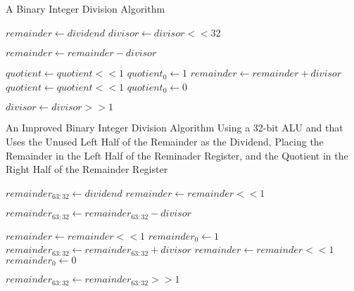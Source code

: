 \documentclass[11pt]{article}
\begin{document}
\begin{algorithm}[hbt!]
\caption{A Binary Integer Division Algorithm}\label{alg:div1}
\begin{algorithmic}

\State $remainder \gets dividend$
\State $divisor \gets divisor << 32$

    \State $remainder \gets remainder - divisor$
    
        \State $quotient \gets quotient << 1$
        \State $quotient_{0} \gets 1$
    \Else
        \State $remainder \gets remainder + divisor$
        \State $quotient \gets quotient << 1$
        \State $quotient_{0} \gets 0$    
    \EndIf
    
    \State $divisor \gets divisor >> 1$
\EndFor

\end{algorithmic}
\end{algorithm}

\pagebreak

\begin{algorithm}[hbt!]
\caption{An Improved Binary Integer Division Algorithm Using a 32-bit ALU and that Uses the Unused Left Half of the Remainder as the Dividend, Placing the Remainder in the Left Half of the Reminader Register, and the Quotient in the Right Half of the Remainder Register}\label{alg:div1}
\begin{algorithmic}

\State $remainder_{63:32} \gets dividend$
\State $remainder \gets remainder << 1$

    \State $remainder_{63:32} \gets remainder_{63:32} - divisor$
    
        \State $remainder \gets remainder << 1$
        \State $remainder_{0} \gets 1$
    \Else
        \State $remainder_{63:32} \gets remainder_{63:32} + divisor$
        \State $remainder \gets remainder << 1$
        \State $remainder_{0} \gets 0$    
    \EndIf
\EndFor

\State $remainder_{63:32} \gets remainder_{63:32} >> 1$

\end{algorithmic}
\end{algorithm}
\end{document}
